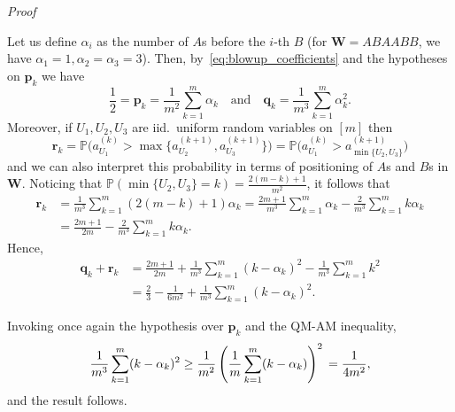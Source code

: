 \documentclass[reqno,a4paper,11pt]{amsart}
\makeatletter
\theoremstyle{remark}
\newcommand{\mb}[1]{{\mathbf #1}}
\newcommand{\bb}[1]{{\mathbb #1}}
\numberwithin{equation}{section}
\renewenvironment{proof}[1][Proof]{\par
\pushQED{\qed}%
\normalfont \topsep6\p@\@plus6\p@\relax
\trivlist
\item\relax
{\itshape
#1\@addpunct{.}}\hspace\labelsep\ignorespaces
}{%
\popQED\endtrivlist\@endpefalse
}
\makeatother
\begin{document}
\begin{proof}
    Let us define $\alpha_i$ as the number of $A$s before the $i$-th $B$ (for $\mb W =
    ABAABB$, we have $\alpha_1=1, \alpha_2=\alpha_3=3$). Then,
    by~\eqref{eq:blowup_coefficients} and the hypotheses on $\mb p_k$
    we have
    \begin{equation*}
        \frac{1}{2} = \mb p_k = \frac{1}{m^2} \sum_{k=1}^m \alpha_k
        \quad \text{and} \quad
        \mb q_k = \frac{1}{m^3} \sum_{k=1}^m \alpha_k^{2}.
    \end{equation*}
    Moreover, if $U_1, U_2, U_3$ are iid.\ uniform random variables on $[m]$ then
    \begin{equation*}
        \mb r_k
        = \bb P \bigl(a^{(k)}_{U_1} > \max\{a^{(k+1)}_{U_2}, a^{(k+1)}_{U_3}\}\bigr)
        = \bb P \bigl(a^{(k)}_{U_1} > a^{(k+1)}_{\min\{U_2,U_3\}}\bigr)
    \end{equation*}
    and we can also interpret this probability in terms of positioning of $A$s and
    $B$s in $\mb W$. Noticing that $\bb P(\min\{U_2,U_3\}=k) = \frac{2(m-k)+1}{m^2}$,
    it follows that
    \begin{align*}
    \mb r_k
        &= \frac{1}{m^3} \sum_{k=1}^m (2(m-k) + 1 )\alpha_k
        = \frac{2m+1}{m^3} \sum_{k=1}^m \alpha_k
            - \frac{2}{m^3} \sum_{k=1}^m k\alpha_k\\
        &= \frac{2m+1}{2m} - \frac{2}{m^3} \sum_{k=1}^m k\alpha_k.
    \end{align*}
    Hence,
    \begin{align*}
        \mb q_k+\mb r_k&=\frac{2m+1}{2m} + \frac{1}{m^3} \sum_{k=1}^m (k-\alpha_k)^2-\frac{1}{m^3}\sum_{k=1}^{m}k^2\\
        &=\frac{2}{3}-\frac{1}{6m^2}+\frac{1}{m^3} \sum_{k=1}^m (k-\alpha_k)^2.
    \end{align*}
    
    Invoking once again the hypothesis over $\mb p_k$ and the QM-AM inequality,
    \begin{equation*}
        \frac{1}{m^3} \sum_{k=1}^m (k-\alpha_k)^2 
        \ge \frac{1}{m^2} \left(\frac{1}{m}\sum_{k=1}^m (k-\alpha_k)\right)^2\\
        = \frac{1}{4m^2},
    \end{equation*}
    and the result follows.
\end{proof}
\end{document}
